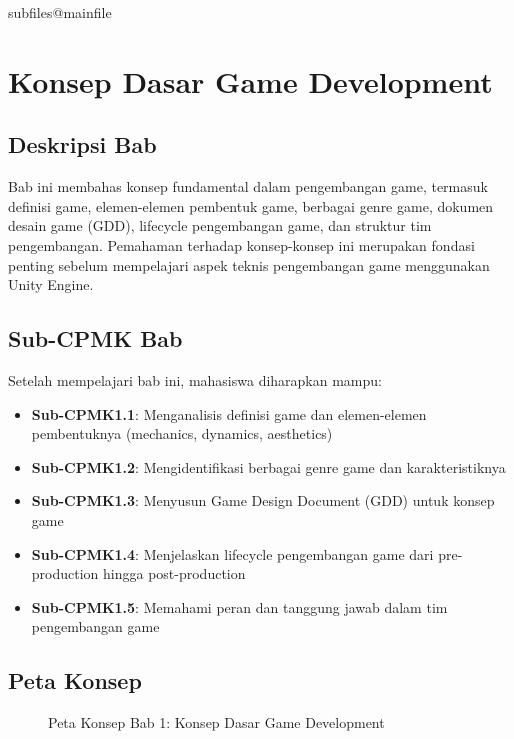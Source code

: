 \documentclass[../../main.tex]{subfiles}
\begin{document}
\ifcsname subfiles@mainfile\endcsname\else
    \setcounter{chapter}{0}
\fi
\chapter{Konsep Dasar Game Development}

\section{Deskripsi Bab}

Bab ini membahas konsep fundamental dalam pengembangan game, termasuk definisi game, elemen-elemen pembentuk game, berbagai genre game, dokumen desain game (GDD), lifecycle pengembangan game, dan struktur tim pengembangan. Pemahaman terhadap konsep-konsep ini merupakan fondasi penting sebelum mempelajari aspek teknis pengembangan game menggunakan Unity Engine.

\section{Sub-CPMK Bab}

Setelah mempelajari bab ini, mahasiswa diharapkan mampu:
\begin{itemize}
\item \textbf{Sub-CPMK1.1}: Menganalisis definisi game dan elemen-elemen pembentuknya (mechanics, dynamics, aesthetics)
\item \textbf{Sub-CPMK1.2}: Mengidentifikasi berbagai genre game dan karakteristiknya
\item \textbf{Sub-CPMK1.3}: Menyusun Game Design Document (GDD) untuk konsep game
\item \textbf{Sub-CPMK1.4}: Menjelaskan lifecycle pengembangan game dari pre-production hingga post-production
\item \textbf{Sub-CPMK1.5}: Memahami peran dan tanggung jawab dalam tim pengembangan game
\end{itemize}

\section{Peta Konsep}

\begin{figure}[h]
\centering
{}
\caption{Peta Konsep Bab 1: Konsep Dasar Game Development}
\label{fig:ch01_concept_map}
\end{figure}
\end{document}
